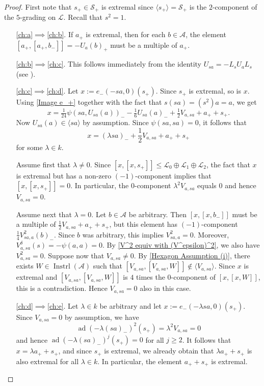 \documentclass[oneside,a4paper]{amsart} %
\theoremstyle{definition}
\DeclareMathOperator{\Inst}{Instrl}
\DeclareMathOperator{\ad}{ad}
\newcommand{\A}{\mathcal{A}}
\renewcommand{\SS}{\mathcal{S}}
\newcommand{\LL}{\mathcal{L}}
\numberwithin{equation}{section}
\begin{document}
\begin{proof}
	First note that $s_+\in\SS_+$ is extremal since $\langle s_+\rangle=\SS_+$ is the $2$-component of the $5$-grading on $\LL$. Recall that $s^2=1$.
	\begin{itemize}\itemsep1ex
	\item[\cref{ch:a}$\implies$\cref{ch:b}.]
    	If $a_+$ is extremal, then for each $b \in \A$, the element $[a_+,[a_+,b_-]]=-U_a(b)_+$ must be a multiple of $a_+$.
    	
	\item[\cref{ch:b}$\implies$\cref{ch:c}.]
    	This follows immediately from the identity $U_{sa}=-L_sU_aL_s$ (see \cite[Proposition 11.3]{Allison1981}).
    	
	\item[\cref{ch:c}$\implies$\cref{ch:d}.]
        Let $x:=e_-(-sa,0)(s_+)$.
    	Since $s_+$ is extremal, so is $x$.
    	Using \cref{Image e_+} together with the fact that $s(sa)=(s^2)a=a$, we get
    	\[ x = \tfrac{1}{24} \psi(sa, U_{sa}(a))_--\tfrac 1 6 U_{sa}(a)_-+\tfrac 1 2 V_{a,sa}+a_++s_+ . \]
    	Now $U_{sa}(a)\in\langle sa\rangle$ by assumption. Since $\psi(sa,sa)=0$, it follows that
    	\[ x=(\lambda sa)_-+\frac{1}{2}V_{a,sa}+a_++s_+ \]
    	for some $\lambda \in k$.
    	
    	Assume first that $\lambda\neq 0$. Since $[x,[x,s_+]]\leq \LL_0\oplus \LL_1\oplus \LL_2$, the fact that $x$ is extremal but has a non-zero $(-1)$-component implies that $[x,[x,s_+]]=0$. 
    	In particular, the $0$-component $\lambda^2V_{a,sa}$ equals $0$ and hence $V_{a,sa} = 0$.
    	
    	Assume next that $\lambda=0$. Let $b \in \A$ be arbitrary. Then $[x,[x,b_-]]$ must be a multiple of $\frac{1}{2}V_{a,sa}+a_++s_+$, but this element has $(-1)$-component $\tfrac{1}{4} V_{sa,a}^2(b)_-$.
    	Since $b$ was arbitrary, this implies $V_{sa,a}^2=0$.
    	Moreover, $V_{a,sa}^\delta(s)=-\psi(a,a)=0$. 
    	By \cref{V^2 equiv with (V^epsilon)^2}, we also have $V_{a,sa}^2 = 0$.
    	Suppose now that $V_{a,sa}\neq 0$.
    	By \cref{Hexagon Assumption (i)}, there exists $W\in\Inst(\A)$ such that $[V_{a,sa},[V_{a,sa},W]]\not\in \langle V_{a,sa}\rangle$. 
    	Since $x$ is extremal and $[V_{a,sa},[V_{a,sa},W]]$ is $4$ times the $0$-component of $[x,[x,W]]$, this is a contradiction. 
    	Hence $V_{a,sa}=0$ also in this case.
    	
	\item[\cref{ch:d}$\implies$\cref{ch:e}.]
        Let $\lambda \in k$ be arbitrary and let $x := e_-(-\lambda sa,0)(s_+)$.
    	Since $V_{a, sa} = 0$ by assumption, we have
    	\[ \ad(-\lambda (sa)_-)^2 (s_+)=\lambda^2 V_{a,sa}=0 \]
    	and hence $\ad(-\lambda (sa)_-)^j (s_+)=0$ for all $j\geq 2$.
    	It follows that $x = \lambda a_+ + s_+$, and since $s_+$ is extremal, we already obtain that $\lambda a_++s_+$ is also extremal for all $\lambda\in k$.
    	In particular, the element $a_++s_+$ is extremal.
    	

\end{itemize}
\end{proof}
\end{document}
